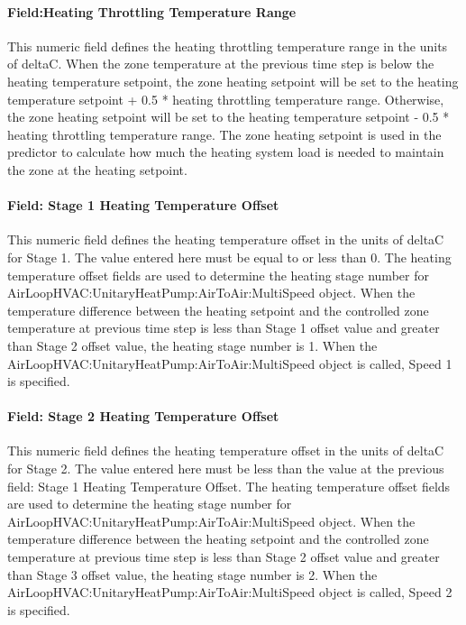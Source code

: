 \paragraph{Field:Heating Throttling Temperature Range}\label{fieldheating-throttling-temperature-range}

This numeric field defines the heating throttling temperature range in the units of deltaC. When the zone temperature at the previous time step is below the heating temperature setpoint, the zone heating setpoint will be set to the heating temperature setpoint + 0.5 * heating throttling temperature range. Otherwise, the zone heating setpoint will be set to the heating temperature setpoint - 0.5 * heating throttling temperature range. The zone heating setpoint is used in the predictor to calculate how much the heating system load is needed to maintain the zone at the heating setpoint.

\paragraph{Field: Stage 1 Heating Temperature Offset}\label{field-stage-1-heating-temperature-offset}

This numeric field defines the heating temperature offset in the units of deltaC for Stage 1. The value entered here must be equal to or less than 0. The heating temperature offset fields are used to determine the heating stage number for AirLoopHVAC:UnitaryHeatPump:AirToAir:MultiSpeed object. When the temperature difference between the heating setpoint and the controlled zone temperature at previous time step is less than Stage 1 offset value and greater than Stage 2 offset value, the heating stage number is 1. When the AirLoopHVAC:UnitaryHeatPump:AirToAir:MultiSpeed object is called, Speed 1 is specified.

\paragraph{Field: Stage 2 Heating Temperature Offset}\label{field-stage-2-heating-temperature-offset}

This numeric field defines the heating temperature offset in the units of deltaC for Stage 2. The value entered here must be less than the value at the previous field: Stage 1 Heating Temperature Offset. The heating temperature offset fields are used to determine the heating stage number for AirLoopHVAC:UnitaryHeatPump:AirToAir:MultiSpeed object. When the temperature difference between the heating setpoint and the controlled zone temperature at previous time step is less than Stage 2 offset value and greater than Stage 3 offset value, the heating stage number is 2. When the AirLoopHVAC:UnitaryHeatPump:AirToAir:MultiSpeed object is called, Speed 2 is specified.

